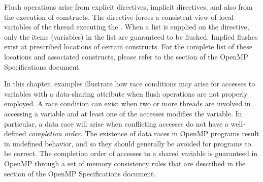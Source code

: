 Flush operations arise from explicit  directives, implicit
 directives, and also from the execution of 
constructs. The  directive forces a  consistent view of local
variables of the thread executing the .  When a list is supplied on
the directive, only the items (variables) in the list are guaranteed to be
flushed.  Implied flushes exist at prescribed locations of certain constructs.
For the complete list of these locations and associated constructs, please
refer to the  section of the OpenMP Specifications
document.

In this chapter, examples illustrate how race conditions may arise for accesses
to variables with a  data-sharing attribute when flush operations
are not properly employed.  A race condition can exist when two or more threads
are involved in accessing a variable and at least one of the accesses modifies
the variable.  In particular, a data race will arise when conflicting accesses
do not have a well-defined \emph{completion order}.  The existence of data
races in OpenMP programs result in undefined behavior, and so they should
generally be avoided for programs to be correct.  The completion order of
accesses to a shared variable is guaranteed in OpenMP through a set of memory
consistency rules that are described in the 
section of the OpenMP Specifications document.




